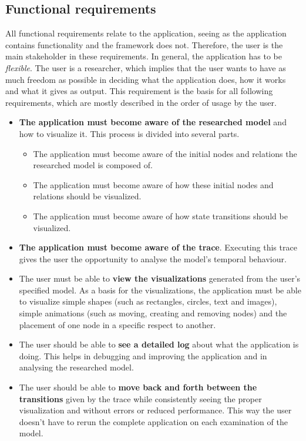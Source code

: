 \documentclass[a4paper]{article}
\begin{document}
	\subsection{Functional requirements}
	All functional requirements relate to the application, seeing as the application contains functionality and the framework does not. Therefore, the user is the main stakeholder in these requirements. In general, the application has to be \emph{flexible}. The user is a researcher, which implies that the user wants to have as much freedom as possible in deciding what the application does, how it works and what it gives as output. This requirement is the basis for all following requirements, which are mostly described in the order of usage by the user.
	\begin{itemize}
		\item \textbf{The application must become aware of the researched model} and how to visualize it. This process is divided into several parts.
		\begin{itemize}
			\item The application must become aware of the initial nodes and relations the researched model is composed of.
			\item The application must become aware of how these initial nodes and relations should be visualized.
			\item The application must become aware of how state transitions should be visualized.
		\end{itemize}
		\item \textbf{The application must become aware of the trace}. Executing this trace gives the user the opportunity to analyse the model's temporal behaviour.
		\item The user must be able to \textbf{view the visualizations} generated from the user's specified model. As a basis for the visualizations, the application must be able to visualize simple shapes (such as rectangles, circles, text and images), simple animations (such as moving, creating and removing nodes) and the placement of one node in a specific respect to another.
		\item The user should be able to \textbf{see a detailed log} about what the application is doing. This helps in debugging and improving the application and in analysing the researched model.
		\item The user should be able to \textbf{move back and forth between the transitions} given by the trace while consistently seeing the proper visualization and without errors or reduced performance. This way the user doesn't have to rerun the complete application on each examination of the model.
	\end{itemize}
	
\end{document}
